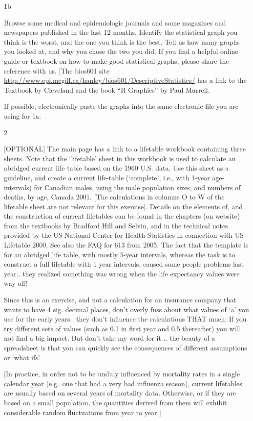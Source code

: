 \documentclass[]{book}
\begin{document}
1b

Browse some medical and epidemiologic journals and some magazines and newspapers published in the last 12 months, Identify the statistical graph you think is the worst, and the one you think is the best. Tell us how many graphs you looked at, and why you chose the two you did. If you find a helpful online guide or textbook on how to make good statistical graphs, please share the reference with us. {[}The bios601 site
\url{http://www.epi.mcgill.ca/hanley/bios601/DescriptiveStatistics/} has a link to the Textbook by Cleveland and the book ``R Graphics'' by Paul Murrell.

If possible, electronically paste the graphs into the same electronic file you are using for 1a.

2

{[}OPTIONAL{]} The main page has a link to a lifetable workbook containing three sheets. Note that the `lifetable' sheet in this workbook is used to calculate an abridged current life table based on the 1960 U.S. data. Use this sheet as a guideline, and create a current life-table (`complete', i.e., with 1-year age-intervals) for Canadian males, using the male population sizes, and numbers of deaths, by age, Canada 2001. {[}The calculations in columns O to W of the lifetable sheet are not relevant for this exercise{]}. Details on the elements of, and the construction of current lifetables can be found in the chapters (on website) from the textbooks by Bradford Hill and Selvin, and in the technical notes provided by the US National Center for Health Statistics in connection with US Lifetable 2000. See also the FAQ for 613 from 2005. The fact that the template is for an abridged life table, with mostly 5-year intervals, whereas the task is to construct a full lifetable with 1 year intervals, caused some people problems last year.. they realized something was wrong when the life expectancy values were way off!

Since this is an exercise, and not a calculation for an insurance company that wants to have 4 sig. decimal places, don't overly fuss about what values of `a' you use for the early years.. they don't influence the calculations THAT much: If you try different sets of values (such as 0.1 in first year and 0.5 thereafter) you will not find a big impact. But don't take my word for it .. the beauty of a spreadsheet is that you can quickly see the consequences of different assumptions or `what ifs'.

{[}In practice, in order not to be unduly influenced by mortality rates in a single calendar year (e.g.~one that had a very bad influenza season), current lifetables are usually based on several years of mortality data. Otherwise, or if they are based on a small population, the quantities derived from them will exhibit considerable random fluctuations from year to year {]}
\end{document}
